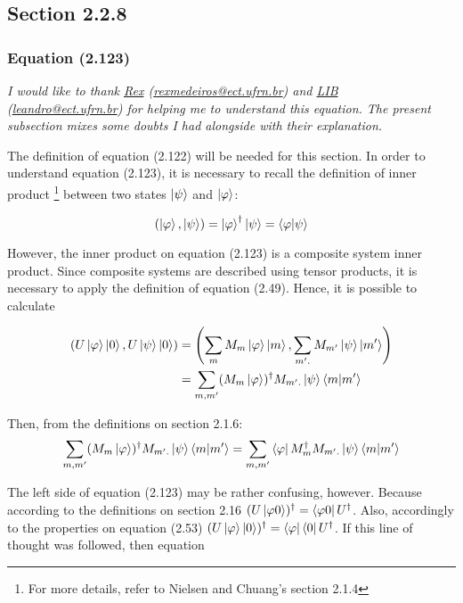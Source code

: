 \subsection{Section 2.2.8}
\subsubsection{Equation (2.123)}

\emph{I would like to thank
    \href{http://buscatextual.cnpq.br/buscatextual/visualizacv.do?id=K4774458A4}{Rex}
    (\href{mailto:rexmedeiros@ect.ufrn.br}{rexmedeiros@ect.ufrn.br})
    and
    \href{http://buscatextual.cnpq.br/buscatextual/visualizacv.do?id=K4733964Y9&idiomaExibicao=2}{LIB} 
    (\href{mailto:leandro@ect.ufrn.br}{leandro@ect.ufrn.br})
    for helping me to understand this equation. The present subsection mixes some doubts I had alongside with their explanation.
}

The definition of equation (2.122) will be needed for this section. In order to understand equation (2.123), it is necessary to recall the definition of inner product \footnote{For more details, refer to Nielsen and Chuang's section 2.1.4} between two states $\ket{\psi}$ and $\ket{\varphi}$:

\[
(\ket{\varphi}, \ket{\psi}) = \ket{\varphi}^\dagger \ket{\psi} = \mathop{\mathinner{ \langle{\varphi}|{\psi}\rangle}}
\]

However, the inner product on equation (2.123) is a composite system inner product. Since composite systems are described using tensor products, it is necessary to apply the definition of equation (2.49). Hence, it is possible to calculate

\begin{align}
    \left( U \ket{\varphi} \ket{0}, U \ket{\psi} \ket{0} \right) &= 
    \left( \sum_m M_m \ket{\varphi} \ket{m} , \sum_{m'.} M_{m'} \ket{\psi} \ket{m'} \right)
    \\
    &= \sum_{m, m'} (M_m\ket{\varphi})^\dagger M_{m'.}\ket{\psi} \mathop{\mathinner{ \langle{m}|{m'}\rangle}}
\end{align}

Then, from the definitions on section 2.1.6:
\begin{align}
    \sum_{m, m'} (M_m\ket{\varphi})^\dagger M_{m'.}\ket{\psi} \mathop{\mathinner{ \langle{m}|{m'}\rangle}} =
    \sum_{m, m'} \bra{\varphi} M_m^\dagger M_{m'.}\ket{\psi} \mathop{\mathinner{ \langle{m}|{m'}\rangle}}
\end{align}


The left side of equation (2.123) may be rather confusing, however. Because according to the definitions on section 2.16 $(U \ket{\varphi 0})^\dagger = \bra{\varphi 0} U^\dagger$. Also, accordingly to the properties on equation (2.53)  $(U \ket{\varphi} \ket{0})^\dagger = \bra{\varphi} \bra{0} U^\dagger$. If this line of thought was followed, then equation

